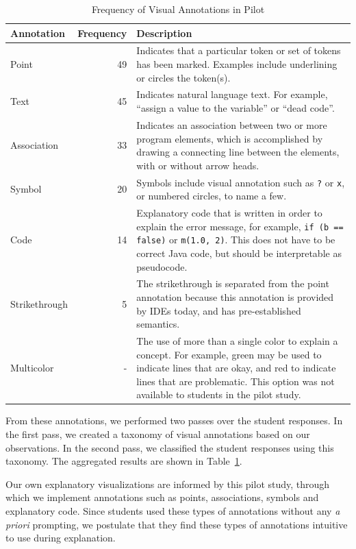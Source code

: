 \documentclass[conference]{IEEEtran}
\begin{document}
\begin{table}[!t]
\caption{Frequency of Visual Annotations in Pilot\label{tab:pilot}}
\centering
\begin{tabularx}{\columnwidth}{lrX}
\toprule
Annotation & Frequency & Description\\
\midrule
Point & 49 & Indicates that a particular token or set of tokens has been marked. Examples include underlining or circles the token(s).\\
[0.2cm]
Text & 45 & Indicates natural language text. For example, ``assign a value to the variable'' or ``dead code''.\\
[0.2cm]
Association & 33 & Indicates an association between two or more program elements, which is accomplished by drawing a connecting line between the elements, with or without arrow heads.\\
[0.2cm]
Symbol & 20 & Symbols include visual annotation such as \texttt{?} or \texttt{x}, or numbered circles, to name a few.\\
[0.2cm]
Code & 14 & Explanatory code that is written in order to explain the error message, for example, \texttt{if (b == false)} or \texttt{m(1.0, 2)}. This does not have to be correct Java code, but should be interpretable as pseudocode.\\
[0.2cm]
Strikethrough & 5 & The strikethrough is separated from the point annotation because this annotation is provided by IDEs today, and has pre-established semantics.
\\
[0.2cm]
Multicolor & - & The use of more than a single color to explain a concept. For example, green may be used to indicate lines that are okay, and red to indicate lines that are problematic. This option was not available to students in the pilot study.\\
[0.2cm]
\bottomrule
\end{tabularx}
\end{table}

From these annotations, we performed two passes over the student responses. In the first pass, we created a taxonomy of visual annotations based on our observations. In the second pass, we classified the student responses using this taxonomy. The aggregated results are shown in Table~\ref{tab:pilot}.

Our own explanatory visualizations are informed by this pilot study, through which we implement annotations such as points, associations, symbols and explanatory code. Since students used these types of annotations without any \textit{a priori} prompting, we postulate that they find these types of annotations intuitive to use during explanation.
\end{document}
